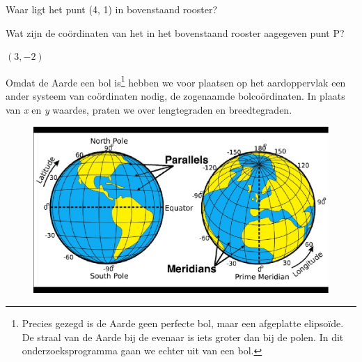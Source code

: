 \begin{opgave}
	\begin{subopgave}
		Waar ligt het punt (4, 1) in bovenstaand rooster?
		\begin{antwoord}		
		\end{antwoord}
	\end{subopgave}
	\begin{subopgave}
		Wat zijn de co\"ordinaten van het in het bovenstaand rooster aagegeven punt P?
		\begin{antwoord}
			$(3, -2)$
		\end{antwoord}
	\end{subopgave}
\end{opgave}

Omdat de Aarde een bol is\footnote{Precies gezegd is de Aarde geen perfecte bol, maar een afgeplatte elipso\"ide. De straal van de Aarde bij de evenaar is iets groter dan bij de polen. In dit onderzoeksprogramma gaan we echter uit van een bol.} hebben we voor plaatsen op het aardoppervlak een ander systeem van co\"ordinaten nodig, de zogenaamde bolco\"ordinaten. In plaats van \textit{x} en \textit{y} waardes, praten we over lengtegraden en breedtegraden.

\begin{figure}[h]
	\centering
	\includegraphics[width=15cm]{Parallels-and-Meridians.eps}
\end{figure}

